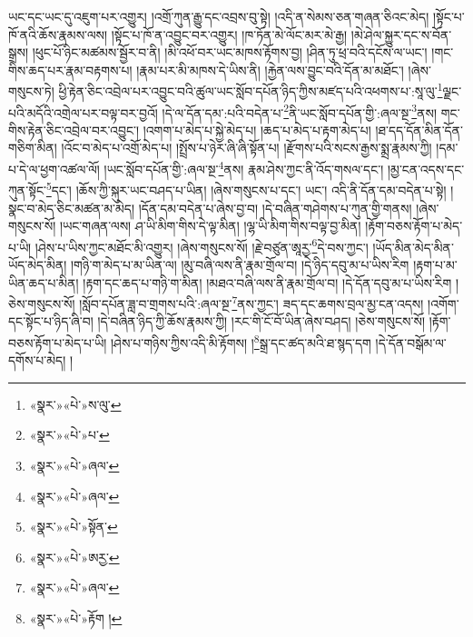 ཡང་དང་ཡང་དུ་འཇུག་པར་འགྱུར། །འགྲོ་ཀུན་རྒྱུ་དང་འབྲས་བུ་སྟེ། །འདི་ན་སེམས་ཅན་གཞན་ཅིའང་མེད། །སྟོང་པ་ཁོ་ནའི་ཆོས་རྣམས་ལས། །སྟོང་པ་ཁོ་ན་འབྱུང་བར་འགྱུར། །ཁ་ཏོན་མེ་ལོང་མར་མེ་རྒྱ། །མེ་ཤེལ་སྐྱུར་དང་ས་བོན་སྒྲས། །ཕུང་པོ་ཉིང་མཚམས་སྦྱོར་བ་ནི། །མི་འཕོ་བར་ཡང་མཁས་རྟོགས་བྱ། །ཤིན་ཏུ་ཕྲ་བའི་དངོས་ལ་ཡང་། །གང་གིས་ཆད་པར་རྣམ་བརྟགས་པ། །རྣམ་པར་མི་མཁས་དེ་ཡིས་ནི། །རྐྱེན་ལས་བྱུང་བའི་དོན་མ་མཐོང་། །ཞེས་གསུངས་ཏེ། ཕྱི་རྟེན་ཅིང་འབྲེལ་པར་འབྱུང་བའི་ཚུལ་ཡང་སློབ་དཔོན་ཉིད་ཀྱིས་མཛད་པའི་འཕགས་པ་:སཱ་ལུ་\footnote{«སྣར་»«པེ་»ས་ལུ་}ལྗང་པའི་མདོའི་འགྲེལ་པར་བལྟ་བར་བྱའོ། །དེ་ལ་དོན་དམ་:པའི་བདེན་པ་\footnote{«སྣར་»«པེ་»པ་}ནི་ཡང་སློབ་དཔོན་གྱི་:ཞལ་སྔ་\footnote{«སྣར་»«པེ་»ཞལ་}ནས། གང་གིས་རྟེན་ཅིང་འབྲེལ་བར་འབྱུང་། །འགག་པ་མེད་པ་སྐྱེ་མེད་པ། །ཆད་པ་མེད་པ་རྟག་མེད་པ། །ཐ་དད་དོན་མིན་དོན་གཅིག་མིན། །འོང་བ་མེད་པ་འགྲོ་མེད་པ། །སྤྲོས་པ་ཉེར་ཞི་ཞི་སྟོན་པ། །རྫོགས་པའི་སངས་རྒྱས་སྨྲ་རྣམས་ཀྱི། །དམ་པ་དེ་ལ་ཕྱག་འཚལ་ལོ། །ཡང་སློབ་དཔོན་གྱི་:ཞལ་སྔ་\footnote{«སྣར་»«པེ་»ཞལ་}ནས། རྣམ་ཤེས་ཀྱང་ནི་འོད་གསལ་དང་། །མྱ་ངན་འདས་དང་ཀུན་སྟོང་\footnote{«སྣར་»«པེ་»སྟོན་}དང་། །ཆོས་ཀྱི་སྐུར་ཡང་བཤད་པ་ཡིན། །ཞེས་གསུངས་པ་དང་། ཡང་། འདི་ནི་དོན་དམ་བདེན་པ་སྟེ། །སྣང་བ་མེད་ཅིང་མཚན་མ་མེད། །དོན་དམ་བདེན་པ་ཞེས་བྱ་བ། །དེ་བཞིན་གཤེགས་པ་ཀུན་གྱི་གནས། །ཞེས་གསུངས་སོ། །ཡང་གཞན་ལས། ཤ་ཡི་མིག་གིས་དེ་ལྟ་མིན། །ལྷ་ཡི་མིག་གིས་བལྟ་བྱ་མིན། །རྟོག་བཅས་རྟོག་པ་མེད་པ་ཡི། །ཤེས་པ་ཡིས་ཀྱང་མཐོང་མི་འགྱུར། །ཞེས་གསུངས་སོ། །རྗེ་བཙུན་ཨཱརྱ་\footnote{«སྣར་»«པེ་»ཨརྱ་}དེ་བས་ཀྱང་། །ཡོད་མིན་མེད་མིན་ཡོད་མེད་མིན། །གཉི་ག་མེད་པ་མ་ཡིན་ལ། །མུ་བཞི་ལས་ནི་རྣམ་གྲོལ་བ། །དེ་ཉིད་དབུ་མ་པ་ཡིས་རིག །རྟག་པ་མ་ཡིན་ཆད་པ་མིན། །རྟག་དང་ཆད་པ་གཉི་ག་མིན། །མཐའ་བཞི་ལས་ནི་རྣམ་གྲོལ་བ། །དེ་དོན་དབུ་མ་པ་ཡིས་རིག །ཅེས་གསུངས་སོ། །སློབ་དཔོན་ཟླ་བ་གྲགས་པའི་:ཞལ་སྔ་\footnote{«སྣར་»«པེ་»ཞལ་}ནས་ཀྱང་། ཟད་དང་ཆགས་བྲལ་མྱ་ངན་འདས། །འགོག་དང་སྟོང་པ་ཉིད་ཞི་བ། །དེ་བཞིན་ཉིད་ཀྱི་ཆོས་རྣམས་ཀྱི། །རང་གི་ངོ་བོ་ཡིན་ཞེས་བཤད། །ཅེས་གསུངས་སོ། །རྟོག་བཅས་རྟོག་པ་མེད་པ་ཡི། །ཤེས་པ་གཉིས་ཀྱིས་འདི་མི་རྟོགས། །\footnote{«སྣར་»«པེ་»རྟོག །}སྒྲ་དང་ཚད་མའི་ཐ་སྙད་དག །དེ་དོན་བསྒོམ་ལ་དགོས་པ་མེད། །
